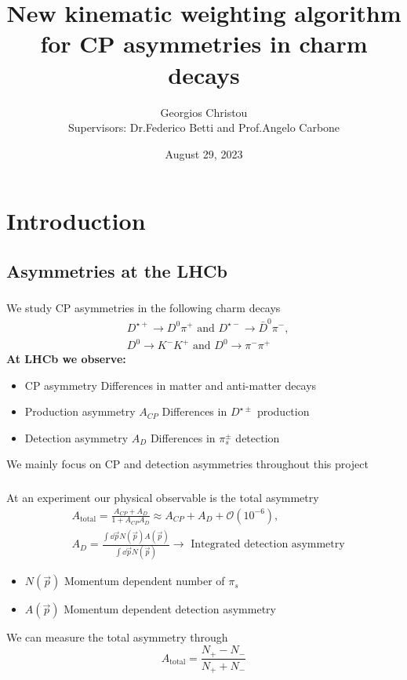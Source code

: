\documentclass{beamer}
\title[\href{https://summerstudent.web.cern.ch/home}{CERN Summer Student Programme 2023}]
{     
      New kinematic weighting algorithm for CP asymmetries in charm decays
}
\author[\href{https://github.com/GiorgosChr}{Georgios Christou}]
{Georgios Christou
\\
Supervisors: Dr.\@ Federico Betti and Prof.\@ Angelo Carbone}
\institute[\href{https://lhcb.web.cern.ch/}{LHCb}]
{
      LHCb Collaboration
}
\date{August 29, 2023}
\begin{document}
\frame{\titlepage}
\begin{frame}
      \tableofcontents
\end{frame}

\section{Introduction}
\subsection{Asymmetries at the LHCb}

\begin{frame}
      \frametitle{\insertsubsectionhead}
      \rightarrow We study CP asymmetries in the following charm decays
      \begin{eqnarray*}
            &D^{\star+}\to D^0\pi^+ \text{ and } D^{\star-}\to \bar{D}^0\pi^-, \nonumber\\
            &D^0 \to K^-K^+ \text{ and } D^0 \to \pi^-\pi^+
    \end{eqnarray*}
      \textbf{At LHCb we observe:}
      \begin{itemize}
            \item CP asymmetry \rightarrow Differences in matter and anti-matter decays
            \item Production asymmetry $A_{CP}$ \rightarrow Differences in $D^{\star\pm}$ production
            \item Detection asymmetry $A_{D}$ \rightarrow Differences in $\pi_s^{\pm}$ detection
      \end{itemize}
      \bigbreak
      \rightarrow We mainly focus on CP and detection asymmetries throughout this project
\end{frame}

\begin{frame}
      \frametitle{\insertsubsectionhead}
      \rightarrow At an experiment our physical observable is the total asymmetry
      \begin{eqnarray*}
            &A_\text{total} = \frac{A_{CP} + A_{D}}{1 + A_{CP}A_D}\approx A_{CP} + A_{D} + \mathcal{O}(10^{-6}),\nonumber\\
            &A_{D} = \frac{\int \dd \vec{p} N(\vec{p})A(\vec{p})}{\int \dd \vec{p} N(\vec{p})}\to \text{ Integrated detection asymmetry}
      \end{eqnarray*}
      \begin{itemize}
            \item $N(\vec{p})$ \rightarrow Momentum dependent number of $\pi_s$
            \item $A(\vec{p})$ \rightarrow Momentum dependent detection asymmetry
      \end{itemize}
      \rightarrow We can measure the total asymmetry through
      \begin{equation*}
            A_\text{total} = \frac{N_+ - N_-}{N_+ + N_-}
      \end{equation*}
\end{frame}
\end{document}
